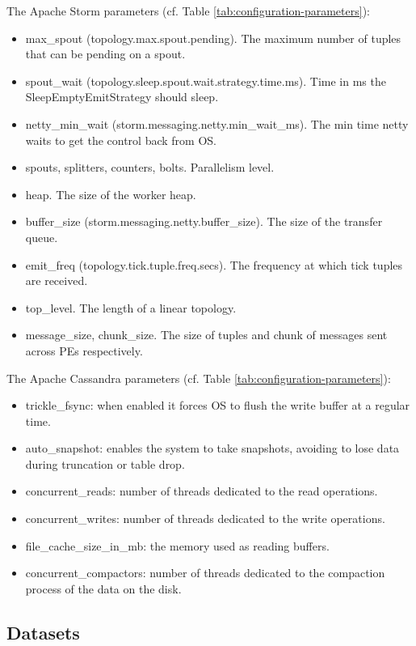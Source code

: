 \documentclass[letter]{vldb}
\begin{document}
{\small 
The Apache Storm parameters (cf. Table \ref{tab:configuration-parameters}): 
\begin{itemize}
	\setlength\itemsep{0em}
	\item {\sf max\_spout (topology.max.spout.pending)}. The maximum number of tuples that can be pending on a spout.
	\item {\sf spout\_wait (topology.sleep.spout.wait.strategy.time.ms)}. Time in ms the {\sf SleepEmptyEmitStrategy} should sleep.
	\item  {\sf netty\_min\_wait (storm.messaging.netty.min\_wait\_ms)}. The min time {\sf netty} waits to get the control back from OS. 
	\item {\sf spouts, splitters, counters, bolts}. Parallelism level. 
	\item {\sf heap}. The size of the worker heap.
	\item  {\sf buffer\_size (storm.messaging.netty.buffer\_size)}. The size of the transfer queue.
	\item {\sf emit\_freq (topology.tick.tuple.freq.secs)}. The frequency at which tick tuples are received.
	\item {\sf top\_level}. The length of a linear topology. 
	\item {\sf message\_size, chunk\_size}. The size of tuples and chunk of messages sent across PEs respectively.
\end{itemize}


The Apache Cassandra parameters (cf. Table \ref{tab:configuration-parameters}): 
\begin{itemize}
		\setlength\itemsep{0em}
	\item {\sf trickle\_fsync}: when enabled it forces OS to flush the write buffer at a regular time. 
	\item {\sf auto\_snapshot}: enables the system to take snapshots, avoiding to lose data during truncation or table drop. 
	\item {\sf concurrent\_reads}: number of threads dedicated to the read operations.
	\item {\sf concurrent\_writes}: number of threads dedicated to the write operations. 
	\item {\sf file\_cache\_size\_in\_mb}: the memory used as reading buffers.
	\item {\sf concurrent\_compactors}:  number of threads dedicated to the compaction process of the data on the disk.
\end{itemize}
}

\subsection{Datasets}
\end{document}
